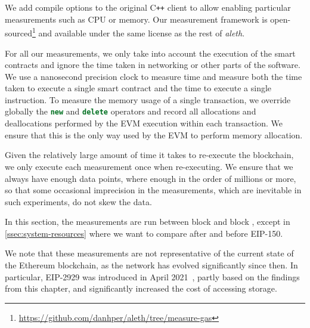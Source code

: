 We add compile options to the original C\texttt{++} client to allow enabling particular measurements such as CPU or memory. Our measurement framework is open-sourced\footnote{\url{https://github.com/danhper/aleth/tree/measure-gas}} and available under the same license as the rest of \textit{aleth}.

For all our measurements, we only take into account the execution of the smart contracts and ignore the time taken in networking or other parts of the software. We use a nanosecond precision clock to measure time and measure both the time taken to execute a single smart contract and the time to execute a single instruction. To measure the memory usage of a single transaction, we override globally the \lstinline[language=C++]{new} and \lstinline[language=C++]{delete} operators and record all allocations and deallocations performed by the EVM execution within each transaction. We ensure that this is the only way used by the EVM to perform memory allocation.

Given the relatively large amount of time it takes to re-execute the blockchain, we only execute each measurement once when re-executing. We ensure that we always have enough data points, where enough in the order of millions or more, so that some occasional imprecision in the measurements, which are inevitable in such experiments, do not skew the data.

In this section, the measurements are run between block  and block , except in \autoref{ssec:system-resources} where we want to compare after and before EIP-150.

We note that these measurements are not representative of the current state of the Ethereum blockchain, as the network has evolved significantly since then.
In particular, EIP-2929 was introduced in April 2021~\cite{eip-2929}, partly based on the findings from this chapter, and significantly increased the cost of accessing storage.

